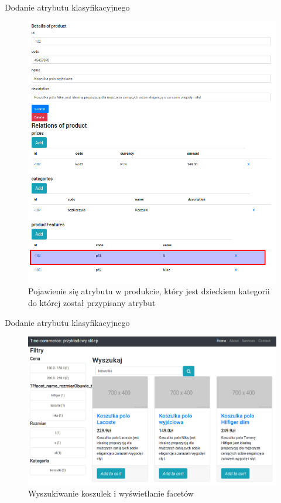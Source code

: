 \documentclass[polish,xcolor=table,9pt,aspectratio=1610,hyperref={pdfpagemode=FullScreen}]{beamer}
\begin{document}
\begin{frame}{Dodanie atrybutu klasyfikacyjnego}
\begin{figure}
	\begin{center}
		\includegraphics[scale=0.2]{13.png}
	\end{center}
	\caption{{\color{black}Pojawienie się atrybutu w produkcie, który jest dzieckiem kategorii do której został przypisany atrybut}} 
\end{figure}
\end{frame}

\begin{frame}{Dodanie atrybutu klasyfikacyjnego}
\begin{figure}
	\begin{center}
		\includegraphics[scale=0.3]{14.png}
	\end{center}
	\caption{{\color{black}Wyszukiwanie koszulek i wyświetlanie facetów}} 
\end{figure}
\end{frame}
\end{document}
